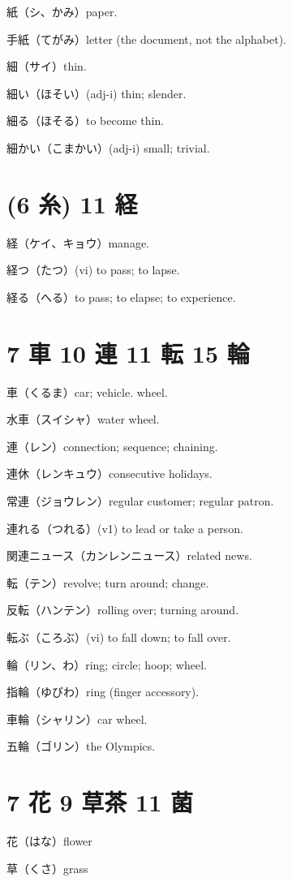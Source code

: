 紙（シ、かみ）paper.

手紙（てがみ）letter (the document, not the alphabet).

細（サイ）thin.

細い（ほそい）(adj-i) thin; slender.

細る（ほそる）to become thin.

細かい（こまかい）(adj-i) small; trivial.

\section{(6 糸) 11 経}

経（ケイ、キョウ）manage.

経つ（たつ）(vi) to pass; to lapse.

経る（へる）to pass; to elapse; to experience.

\section{7 車 10 連 11 転 15 輪}

車（くるま）car; vehicle. wheel.

水車（スイシャ）water wheel.

連（レン）connection; sequence; chaining.

連休（レンキュウ）consecutive holidays.

常連（ジョウレン）regular customer; regular patron.

連れる（つれる）(v1) to lead or take a person.

関連ニュース（カンレンニュース）related news.

転（テン）revolve; turn around; change.

反転（ハンテン）rolling over; turning around.

転ぶ（ころぶ）(vi) to fall down; to fall over.

輪（リン、わ）ring; circle; hoop; wheel.

指輪（ゆびわ）ring (finger accessory).

車輪（シャリン）car wheel.

五輪（ゴリン）the Olympics.

\section{7 花 9 草茶 11 菌}

花（はな）flower

草（くさ）grass

